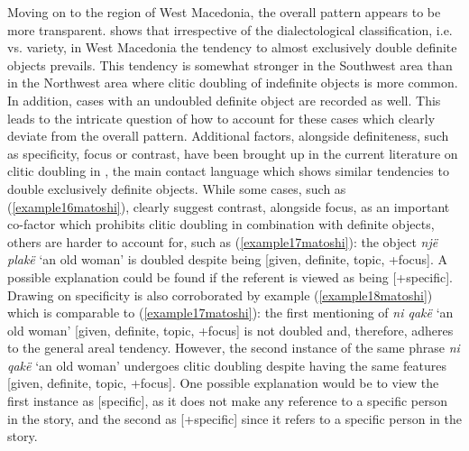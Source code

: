 \documentclass[output=paper]{langsci/langscibook}
\begin{document}
Moving on to the region of West Macedonia, the overall pattern appears to be more transparent.  shows that irrespective of the dialectological classification, i.e.  vs.  variety, in West Macedonia the tendency to almost exclusively double definite objects prevails. This tendency is somewhat stronger in the Southwest area than in the Northwest area where clitic doubling of indefinite objects is more common. In addition, cases with an undoubled definite object are recorded as well. This leads to the intricate question of how to account for these cases which clearly deviate from the overall pattern. Additional factors, alongside definiteness, such as specificity, focus or contrast, have been brought up in the current literature on clitic doubling in , the main contact language \citep[cf. for example][]{Friedman2008} which shows similar tendencies to double exclusively definite objects. While some cases, such as (\ref{example16matoshi}), clearly suggest contrast, alongside focus, as an important co-factor which prohibits clitic doubling in combination with definite objects, others are harder to account for, such as (\ref{example17matoshi}): the object \textit{një plakë} ‘an old woman’ is doubled despite being [\textminus{}given, \textminus{}definite, \textminus{}topic, +focus]. A possible explanation could be found if the referent is viewed as being [+specific]. Drawing on specificity is also corroborated by example (\ref{example18matoshi}) which is comparable to (\ref{example17matoshi}): the first mentioning of \textit{ni qakë} ‘an old woman’ [\textminus{}given, \textminus{}definite, \textminus{}topic, +focus] is not doubled and, therefore, adheres to the general areal tendency. However, the second instance of the same phrase \textit{ni qakë} ‘an old woman’ undergoes clitic doubling despite having the same features [\textminus{}given, \textminus{}definite, \textminus{}topic, +focus]. One possible explanation would be to view the first instance as [\textminus{}specific], as it does not make any reference to a specific person in the story, and the second as [+specific] since it refers to a specific person in the story. 
\end{document}
